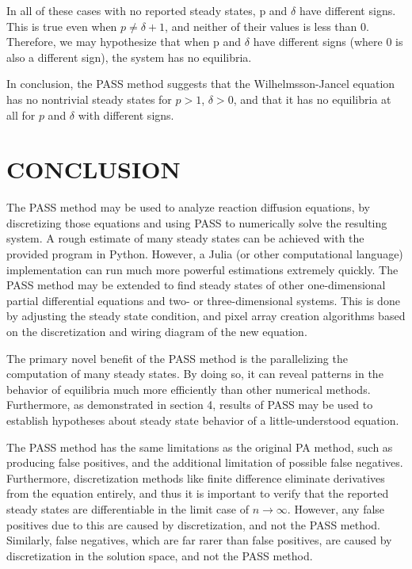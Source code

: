 \documentclass{article}
\begin{document}
In all of these cases with no reported steady states, p and $\delta$ have different signs. This is true even when $p \ne \delta + 1$, and neither of their values is less than 0. Therefore, we may hypothesize that when p and $\delta$ have different signs (where 0 is also a different sign), the system has no equilibria. 

In conclusion, the PASS method suggests that the Wilhelmsson-Jancel equation has no nontrivial steady states for $p > 1$, $\delta > 0$, and that it has no equilibria at all for $p$ and $\delta$ with different signs.

\begin{comment}
\section{ANALYZING THE NONLOCAL FISHER EQUATION}
Ask if this should be included for more variety, maybe legitimacy because relevant research is more recent? Thanks Stanford.
\end{comment}

\section{CONCLUSION}

The PASS method may be used to analyze reaction diffusion equations, by discretizing those equations and using PASS to numerically solve the resulting system. A rough estimate of many steady states can be achieved with the provided program in Python. However, a Julia (or other computational language) implementation can run much more powerful estimations extremely quickly. The PASS method may be extended to find steady states of other one-dimensional partial differential equations and two- or three-dimensional systems. This is done by adjusting the steady state condition, and pixel array creation algorithms based on the discretization and wiring diagram of the new equation.

The primary novel benefit of the PASS method is the parallelizing the computation of many steady states. By doing so, it can reveal patterns in the behavior of equilibria much more efficiently than other numerical methods. Furthermore, as demonstrated in section 4, results of PASS may be used to establish hypotheses about steady state behavior of a little-understood equation.

The PASS method has the same limitations as the original PA method, such as producing false positives, and the additional limitation of possible false negatives. Furthermore, discretization methods like finite difference eliminate derivatives from the equation entirely, and thus it is important to verify that the reported steady states are differentiable in the limit case of $n \rightarrow \infty$. However, any false positives due to this are caused by discretization, and not the PASS method. Similarly, false negatives, which are far rarer than false positives, are caused by discretization in the solution space, and not the PASS method.
\end{document}
